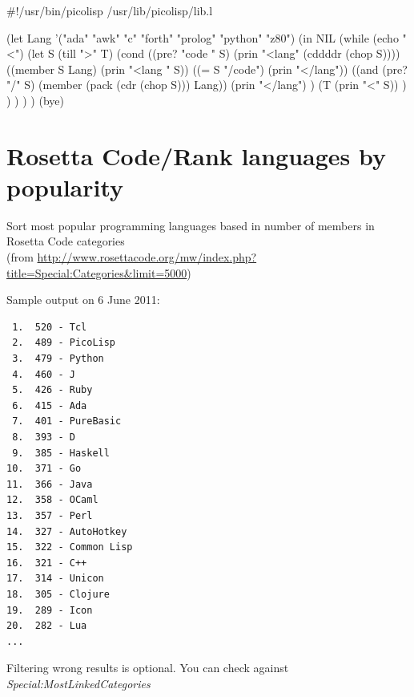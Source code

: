 \begin{wideverbatim}

#!/usr/bin/picolisp /usr/lib/picolisp/lib.l

(let Lang '("ada" "awk" "c" "forth" "prolog" "python" "z80")
   (in NIL
      (while (echo "<")
         (let S (till ">" T)
            (cond
               ((pre? "code " S) (prin "<lang" (cddddr (chop S))))
               ((member S Lang) (prin "<lang " S))
               ((= S "/code") (prin "</lang"))
               ((and (pre? "/" S) (member (pack (cdr (chop S))) Lang))
                  (prin "</lang") )
               (T (prin "<" S)) ) ) ) ) )
(bye)

\end{wideverbatim}

\pagebreak{}
\section*{Rosetta Code/Rank languages by popularity}

Sort most popular programming languages based in number of members in
Rosetta Code categories \\ (from
\href{http://www.rosettacode.org/mw/index.php?title=Special:Categories\&limit=5000}{http://www.rosettacode.org/mw/index.php?title=Special:Categories\&limit=5000})

Sample output on 6 June 2011:

\begin{verbatim}
 1.  520 - Tcl
 2.  489 - PicoLisp
 3.  479 - Python
 4.  460 - J
 5.  426 - Ruby
 6.  415 - Ada
 7.  401 - PureBasic
 8.  393 - D
 9.  385 - Haskell
10.  371 - Go
11.  366 - Java
12.  358 - OCaml
13.  357 - Perl
14.  327 - AutoHotkey
15.  322 - Common Lisp
16.  321 - C++
17.  314 - Unicon
18.  305 - Clojure
19.  289 - Icon
20.  282 - Lua
...
\end{verbatim}

Filtering wrong results is optional. You can check against
\emph{Special:MostLinkedCategories}



